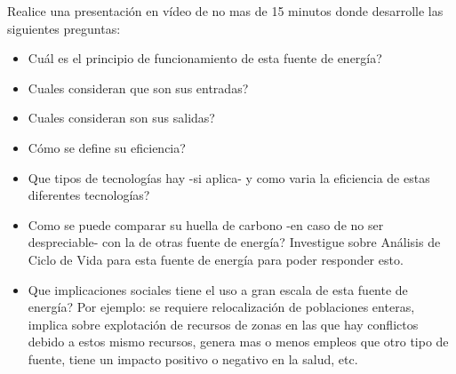 \documentclass[12pt]{article}
\begin{document}
\noindent Realice una presentación en vídeo de no mas de 15 minutos donde desarrolle las siguientes preguntas: 
\begin{itemize}
    \item Cuál es el principio de funcionamiento de esta fuente de energía?
    \item Cuales consideran que son sus entradas? 
    \item Cuales consideran son sus salidas? 
    \item Cómo se define su eficiencia? 
    \item Que tipos de tecnologías hay -si aplica- y como varia la eficiencia de estas diferentes tecnologías?
    \item Como se puede comparar su huella de carbono -en caso de no ser despreciable- con la de otras fuente de energía? Investigue sobre Análisis de Ciclo de Vida para esta fuente de energía para poder responder esto. 
    \item Que implicaciones sociales tiene el uso a gran escala de esta fuente de energía? Por ejemplo: se requiere relocalización de poblaciones enteras, implica sobre explotación de recursos de zonas en las que hay conflictos debido a estos mismo recursos, genera mas o menos empleos que otro tipo de fuente, tiene un impacto positivo o negativo en la salud, etc.
\end{itemize}
\end{document}
